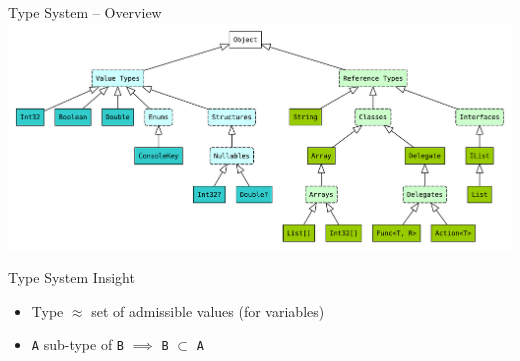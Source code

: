 \documentclass[presentation]{beamer}
\begin{document}
\begin{frame}{\dotnet Type System -- Overview}
    \includegraphics[width=\linewidth]{img/type-system.pdf}

    \begin{block}{Type System Insight}
        \begin{itemize}
            \item Type $\approx$ set of admissible values (for variables)
            \item \texttt{A} sub-type of \texttt{B} $\implies$ \texttt{B} $\subset$ \texttt{A}
        \end{itemize}
    \end{block}
\end{frame}
\end{document}

